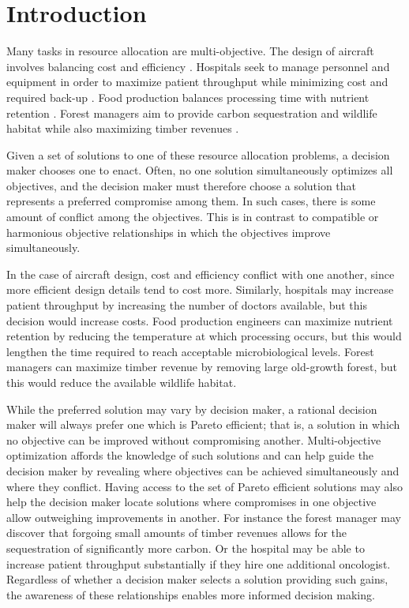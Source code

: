 
\section{Introduction}
\label{sec:intro}

Many tasks in resource allocation are multi-objective. The design of aircraft involves balancing cost and efficiency \cite{wang2014multi}. Hospitals seek to manage personnel and equipment in order to maximize patient throughput while minimizing cost and required back-up \cite{hutzschenreuter2009evolutionary}. Food production balances processing time with nutrient retention \cite{sendin2010efficient}. Forest managers aim to provide carbon sequestration and wildlife habitat while also maximizing timber revenues \cite{toth2013ecosel}.

Given a set of solutions to one of these resource allocation problems, a decision maker chooses one to enact. Often, no one solution simultaneously optimizes all objectives, and the decision maker must therefore choose a solution that represents a preferred compromise among them. In such cases, there is some amount of conflict among the objectives. This is in contrast to compatible or harmonious objective relationships in which the objectives improve simultaneously.

In the case of aircraft design, cost and efficiency conflict with one another, since more efficient design details tend to cost more. Similarly, hospitals may increase patient throughput by increasing the number of doctors available, but this decision would increase costs. Food production engineers can maximize nutrient retention by reducing the temperature at which processing occurs, but this would lengthen the time required to reach acceptable microbiological levels. Forest managers can maximize timber revenue by removing large old-growth forest, but this would reduce the available wildlife habitat.

While the preferred solution may vary by decision maker, a rational decision maker will always prefer one which is Pareto efficient; that is, a solution in which no objective can be improved without compromising another. Multi-objective optimization affords the knowledge of such solutions and can help guide the decision maker by revealing where objectives can be achieved simultaneously and where they conflict. Having access to the set of Pareto efficient solutions may also help the decision maker locate solutions where compromises in one objective allow outweighing improvements in another. For instance the forest manager may discover that forgoing small amounts of timber revenues allows for the sequestration of significantly more carbon. Or the hospital may be able to increase patient throughput substantially if they hire one additional oncologist.
Regardless of whether a decision maker selects a solution providing such gains, the awareness of these relationships enables more informed decision making.

